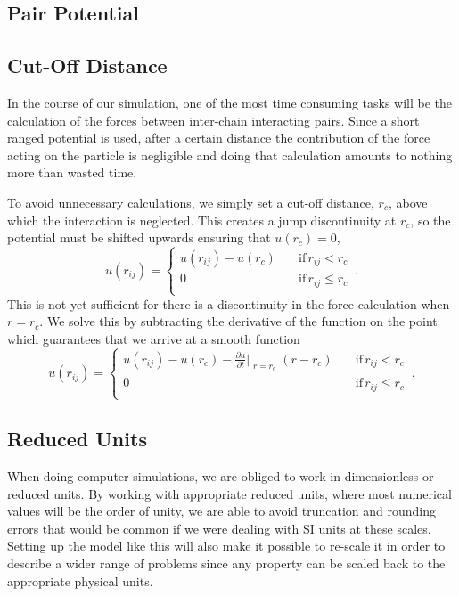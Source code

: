 \documentclass[../../main.tex]{subfiles}
\begin{document}
\begin{appendices}
\chapter{Pair Potential}\label{app: Pair Potential}
\section{Cut-Off Distance}\label{app: Potential Cutt-off}

    In the course of our simulation, one of the most time consuming tasks will be the calculation of the forces between inter-chain interacting pairs. Since a short ranged potential is used, after a certain distance the contribution of the force acting on the particle is negligible and doing that calculation amounts to nothing more than wasted time. 
    
    To avoid unnecessary calculations, we simply set a cut-off distance, $r_c$, above which the interaction is neglected. This creates a jump discontinuity at $r_c$, so the potential must be shifted upwards ensuring that $u(r_c) = 0$,
        \begin{equation}
            u(r_{ij}) = 
            \begin{cases}
                u(r_{ij}) - u(r_c) \quad &\text{if} \, r_{ij} < r_c \\
                0 \quad \quad &\text{if} \, r_{ij} \leq r_c \\
            \end{cases}
            \,.
        \end{equation}
    This is not yet sufficient for there is a discontinuity in the force calculation when $r=r_c$. We solve this by subtracting the derivative of the function on the point which guarantees that we arrive at a smooth function
        \begin{equation}
            u(r_{ij}) = 
            \begin{cases}
                u(r_{ij}) - u(r_c) - \frac{\partial u}{\partial t}\Bigr|_{\substack{r=r_c}}(r - r_c) \quad &\text{if} \, r_{ij} < r_c \\
                0 \quad &\text{if} \, r_{ij} \leq r_c\\
            \end{cases}
            \,.
        \end{equation}

\section{Reduced Units}\label{app: Reduced Units}
    When doing computer simulations, we are obliged to work in dimensionless or reduced units. By working with appropriate reduced units, where most numerical values will be the order of unity, we are able to avoid truncation and rounding errors that would be common if we were dealing with SI units at these scales. Setting up the model like this will also make it possible to re-scale it in order to describe a wider range of problems since any property can be scaled back to the appropriate physical units. 
    

\end{appendices}
\end{document}
